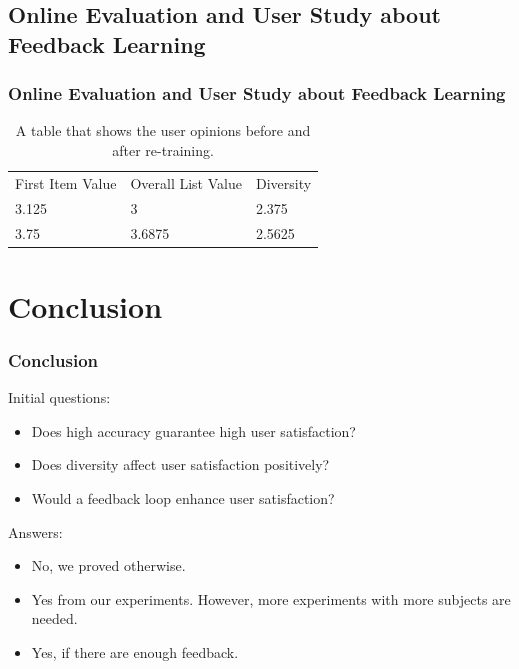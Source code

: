 \documentclass{beamer}
\begin{document}
\subsection{Online Evaluation and User Study about Feedback Learning} 
\begin{frame}
\frametitle{Online Evaluation and User Study about Feedback Learning}
\begin{table}[htp]
	\caption[Online Evaluation Table]{A table that shows the user opinions before and after re-training.}
	\centering
	\begin{tabular}{|l|l|l|}
		First Item Value & Overall List Value & Diversity \\
		3.125 & 3 & 2.375\\
		3.75 & 3.6875 & 2.5625 \\
	\end{tabular}
\end{table}
\end{frame}

\section{Conclusion} 
\begin{frame}
\frametitle{Conclusion}
Initial questions:
\begin{itemize}
	\item Does high accuracy guarantee high user satisfaction?
	\item Does diversity affect user satisfaction positively?
	\item Would a feedback loop enhance user satisfaction?
\end{itemize} 
Answers:
\begin{itemize}
	\item No, we proved otherwise.
	\item Yes from our experiments. However, more experiments with more subjects are needed.
	\item Yes, if there are enough feedback.
\end{itemize} 
\end{frame}
\end{document}
